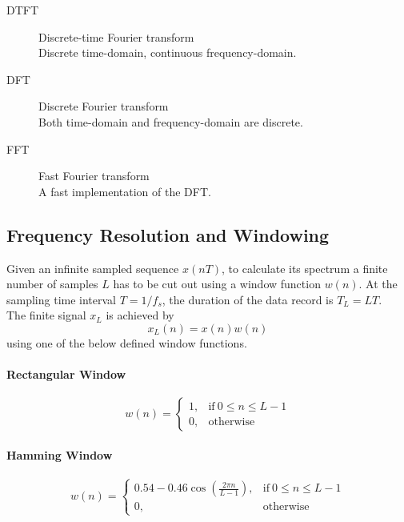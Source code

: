 \begin{description}
	\item[DTFT] Discrete-time Fourier transform \\
		Discrete time-domain, continuous frequency-domain.
	\item[DFT] Discrete Fourier transform \\
		Both time-domain and frequency-domain are discrete.
	\item[FFT] Fast Fourier transform \\
		A fast implementation of the DFT.
\end{description}

\subsection{Frequency Resolution and Windowing}

Given an infinite sampled sequence $x(nT)$, to calculate its spectrum a finite
number of samples $L$ has to be cut out using a window function $w(n)$.
At the sampling time interval $T = 1/f_s$, the duration of the data record
is $T_L = LT$. \\

The finite signal $x_L$ is achieved by
\begin{equation*}
	x_L(n) = x(n) w(n)
\end{equation*}
using one of the below defined window functions. \\

\paragraph{Rectangular Window}
	\begin{equation*}
		w(n) = \begin{cases}
			1, & \text{if} \: 0 \leq n \leq L-1 \\
			0, & \text{otherwise}
		\end{cases}
	\end{equation*}

\paragraph{Hamming Window}
	\begin{equation*}
		w(n) = \begin{cases}
			0.54-0.46 \cos\left(\frac{2 \pi n}{L-1}\right), & \text{if} \: 0 \leq n \leq L-1 \\
			0, & \text{otherwise}
		\end{cases}
	\end{equation*}

